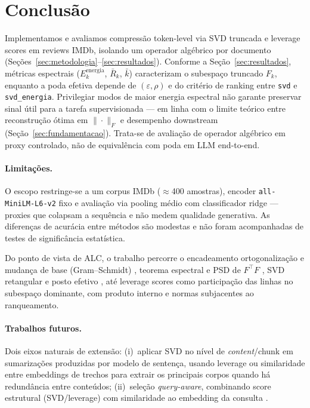 \section{Conclusão}\label{sec:conclusao}

Implementamos e avaliamos compressão token-level via SVD truncada e leverage scores em reviews IMDb, isolando um operador algébrico por documento (Seções~\ref{sec:metodologia}--\ref{sec:resultados}). Conforme a Seção~\ref{sec:resultados}, métricas espectrais ($E_k^{\mathrm{energia}}$, $\bar{R}_k$, $\bar{k}$) caracterizam o subespaço truncado $F_k$, enquanto a poda efetiva depende de $(\varepsilon, \rho)$ e do critério de ranking entre \texttt{svd} e \texttt{svd\_energia}. Privilegiar modos de maior energia espectral não garante preservar sinal útil para a tarefa supervisionada --- em linha com o limite teórico entre reconstrução ótima em $\|\cdot\|_F$ e desempenho downstream (Seção~\ref{sec:fundamentacao}). Trata-se de avaliação de operador algébrico em proxy controlado, não de equivalência com poda em LLM end-to-end.

\paragraph{Limitações.}
O escopo restringe-se a um corpus IMDb ($\approx$400 amostras), encoder \texttt{all-MiniLM-L6-v2} fixo e avaliação via pooling médio com classificador ridge --- proxies que colapsam a sequência e não medem qualidade generativa. As diferenças de acurácia entre métodos são modestas e não foram acompanhadas de testes de significância estatística.

Do ponto de vista de ALC, o trabalho percorre o encadeamento ortogonalização e mudança de base (Gram--Schmidt) \cite{alc11base}, teorema espectral e PSD de $F^\top F$ \cite{alc19espectral}, SVD retangular e posto efetivo \cite{alc21svd,alcposto}, até leverage scores como participação das linhas no subespaço dominante, com produto interno e normas \cite{alc04produto} subjacentes ao ranqueamento.

\paragraph{Trabalhos futuros.}
Dois eixos naturais de extensão: (i)~aplicar SVD no nível de \emph{content}/chunk em sumarizações produzidas por modelo de sentença, usando leverage ou similaridade entre embeddings de trechos para extrair os principais corpos quando há redundância entre conteúdos; (ii)~seleção \emph{query-aware}, combinando score estrutural (SVD/leverage) com similaridade ao embedding da consulta \cite{zhang2026fastcontext,alc04produto}.
